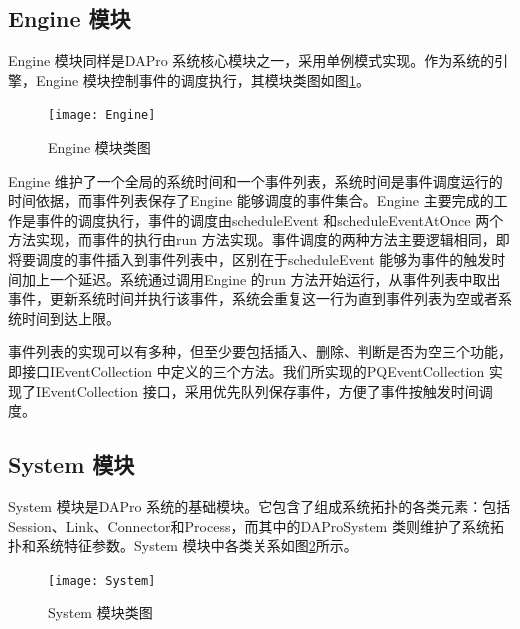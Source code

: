     \subsection{Engine 模块}
    Engine 模块同样是DAPro 系统核心模块之一，采用单例模式实现。作为系统的引擎，Engine 模块控制事件的调度执行，其模块类图如图\ref{Engine}。
    \begin{figure}[ht]
        \centering
        \texttt{[image: Engine]}\\
        \caption{Engine 模块类图}\label{Engine}
    \end{figure}

    Engine 维护了一个全局的系统时间和一个事件列表，系统时间是事件调度运行的时间依据，而事件列表保存了Engine 能够调度的事件集合。Engine 主要完成的工作是事件的调度执行，事件的调度由scheduleEvent 和scheduleEventAtOnce 两个方法实现，而事件的执行由run 方法实现。事件调度的两种方法主要逻辑相同，即将要调度的事件插入到事件列表中，区别在于scheduleEvent 能够为事件的触发时间加上一个延迟。系统通过调用Engine 的run 方法开始运行，从事件列表中取出事件，更新系统时间并执行该事件，系统会重复这一行为直到事件列表为空或者系统时间到达上限。

    事件列表的实现可以有多种，但至少要包括插入、删除、判断是否为空三个功能，即接口IEventCollection 中定义的三个方法。我们所实现的PQEventCollection 实现了IEventCollection 接口，采用优先队列保存事件，方便了事件按触发时间调度。

    \subsection{System 模块}
    System 模块是DAPro 系统的基础模块。它包含了组成系统拓扑的各类元素：包括Session、Link、Connector和Process，而其中的DAProSystem 类则维护了系统拓扑和系统特征参数。System 模块中各类关系如图\ref{System}所示。
    \begin{figure}[ht]
        \centering
        \texttt{[image: System]}\\
        \caption{System 模块类图}\label{System}
    \end{figure}
    

